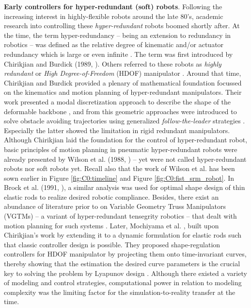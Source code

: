 \par \textbf{Early controllers for hyper-redundant (soft) robots}. Following the increasing interest in highly-flexible robots around the late 80's, academic research into controlling these \textit{hyper-redundant} robots boomed shortly after. At the time, the term hyper-redundancy -- being an extension to redundancy in robotics \cite{MerriamWebster1983} -- was defined as the relative degree of kinematic and/or actuator redundancy which is large or even infinite \cite{Chirikjian1992,Chirikjian1994}. The term was first introduced by Chirikjian and Burdick (1989, \cite{Chirikjian1989}). Others referred to these robots as \textit{highly redundant} \cite{Wilson1988Dec,Naccarato1989Dec} or \textit{High Degree-of-Freedom} (HDOF) manipulator \cite{Salerno1989Jan,Mochiyama1999}. Around that time, Chirikjian and Burdick provided a plenary of mathematical foundation \cite{Chirikjian1994,Chirikjian1994Jun,Chirikjian1991,Chirikjian1992,Chirikjian1992Dec} focussed on the kinematics and motion planning of hyper-redundant manipulators. Their work presented a modal discretization approach to describe the shape of the deformable backbone \cite{Chirikjian1994Jun}, and from this geometric approaches were introduced to solve obstacle avoiding trajectories using generalized \textit{follow-the-leader} strategies \cite{Chirikjian1992Dec}. Especially the latter showed the limitation in rigid redundant manipulators. Although Chirikjian laid the foundation for the control of hyper-redundant robot, basic principles of motion planning in pneumatic hyper-redundant robots were already presented by Wilson et al. (1988, \cite{Wilson1988Dec,Wilson1989Jun}) -- yet were not called hyper-redundant robots nor soft robots yet. Recall also that the work of Wilson et al. has been sown earlier in Figure \ref{fig:C0:timeline} and Figure \ref{fig:C0:fist_srm_robot}. In Brock et al. (1991, \cite{Brock1991}), a similar analysis was used for optimal shape design of thin elastic rods to realize desired robotic compliance. Besides, there exist an abundance of literature prior to \cite{Chirikjian1992} on Variable Geometry Truss Manipulators (VGTMs) -- a variant of hyper-redundant tensegrity robotics -- that dealt with motion planning for such systems \cite{Naccarato1989Dec,Naccarato1991Apr,Salerno1989Jan}. Later, Mochiyama et al. \cite{Mochiyama1998,Mochiyama1999}, built upon Chirikjian's work by extending it to a dynamic formulation for elastic rods such that classic controller design is possible. They proposed shape-regulation controllers for HDOF manipulator by projecting them onto time-invariant curves, thereby showing that the estimation the desired curve parameters is the crucial key to solving the problem by Lyapunov design \cite{Mochiyama1998}. Although there existed a variety of modeling and control strategies, computational power in relation to modeling complexity was the limiting factor for the simulation-to-reality transfer at the time.